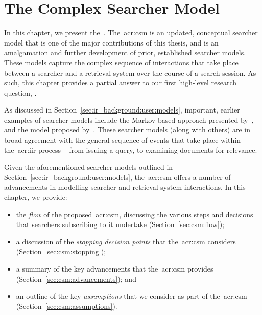 
\chapter[The Complex Searcher Model]{The Complex Searcher Model}\label{chap:csm}
In this chapter, we present the~. The~\gls{acr:csm} is an updated, conceptual searcher model that is one of the major contributions of this thesis, and is an amalgamation and further development of prior, established searcher models. These models capture the complex sequence of interactions that take place between a searcher and a retrieval system over the course of a search session. As such, this chapter provides a partial answer to our first high-level research question, .

\begin{figure}[h]
    \centering
    \vspace{4mm}
    \label{fig:model_example}
    \vspace{-5mm}
\end{figure}

As discussed in Section~\ref{sec:ir_background:user:models}, important, earlier examples of searcher models include the Markov-based approach presented by~\cite{baskaya2013behavioural_factors}, and the model proposed by~\cite{thomas2014modelling_behaviour}. These searcher models (along with others) are in broad agreement with the general sequence of events that take place within the~\gls{acr:iir} process -- from issuing a query, to examining documents for relevance.

Given the aforementioned searcher models outlined in Section~\ref{sec:ir_background:user:models}, the~\gls{acr:csm} offers a number of advancements in modelling searcher and retrieval system interactions. In this chapter, we provide:

\begin{itemize}
    \item{the \emph{flow} of the proposed~\gls{acr:csm}, discussing the various steps and decisions that searchers subscribing to it undertake (Section~\ref{sec:csm:flow});}
    \item{a discussion of the \emph{stopping decision points} that the~\gls{acr:csm} considers (Section~\ref{sec:csm:stopping});}
    \item{a summary of the key advancements that the~\gls{acr:csm} provides (Section~\ref{sec:csm:advancements}); and}
    \item{an outline of the key \emph{assumptions} that we consider as part of the~\gls{acr:csm} (Section~\ref{sec:csm:assumptions}).}
\end{itemize}

